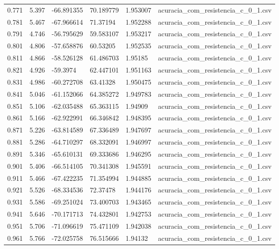 \begin{table}
\begin{tabular}{llllll}
0.771 & 5.397 & -66.891355 & 70.189779 & 1.953007 & acuracia\_com\_resistencia\_c\_0\_1.csv \\
0.781 & 5.467 & -67.966614 & 71.37194 & 1.952288 & acuracia\_com\_resistencia\_c\_0\_1.csv \\
0.791 & 4.746 & -56.795629 & 59.583107 & 1.953217 & acuracia\_com\_resistencia\_c\_0\_1.csv \\
0.801 & 4.806 & -57.658876 & 60.53205 & 1.952535 & acuracia\_com\_resistencia\_c\_0\_1.csv \\
0.811 & 4.866 & -58.526128 & 61.486703 & 1.95185 & acuracia\_com\_resistencia\_c\_0\_1.csv \\
0.821 & 4.926 & -59.3974 & 62.447101 & 1.951163 & acuracia\_com\_resistencia\_c\_0\_1.csv \\
0.831 & 4.986 & -60.272708 & 63.41328 & 1.950475 & acuracia\_com\_resistencia\_c\_0\_1.csv \\
0.841 & 5.046 & -61.152066 & 64.385272 & 1.949783 & acuracia\_com\_resistencia\_c\_0\_1.csv \\
0.851 & 5.106 & -62.035488 & 65.363115 & 1.94909 & acuracia\_com\_resistencia\_c\_0\_1.csv \\
0.861 & 5.166 & -62.922991 & 66.346842 & 1.948395 & acuracia\_com\_resistencia\_c\_0\_1.csv \\
0.871 & 5.226 & -63.814589 & 67.336489 & 1.947697 & acuracia\_com\_resistencia\_c\_0\_1.csv \\
0.881 & 5.286 & -64.710297 & 68.332091 & 1.946997 & acuracia\_com\_resistencia\_c\_0\_1.csv \\
0.891 & 5.346 & -65.610131 & 69.333686 & 1.946295 & acuracia\_com\_resistencia\_c\_0\_1.csv \\
0.901 & 5.406 & -66.514105 & 70.341308 & 1.945591 & acuracia\_com\_resistencia\_c\_0\_1.csv \\
0.911 & 5.466 & -67.422235 & 71.354994 & 1.944885 & acuracia\_com\_resistencia\_c\_0\_1.csv \\
0.921 & 5.526 & -68.334536 & 72.37478 & 1.944176 & acuracia\_com\_resistencia\_c\_0\_1.csv \\
0.931 & 5.586 & -69.251024 & 73.400703 & 1.943465 & acuracia\_com\_resistencia\_c\_0\_1.csv \\
0.941 & 5.646 & -70.171713 & 74.432801 & 1.942753 & acuracia\_com\_resistencia\_c\_0\_1.csv \\
0.951 & 5.706 & -71.096619 & 75.471109 & 1.942038 & acuracia\_com\_resistencia\_c\_0\_1.csv \\
0.961 & 5.766 & -72.025758 & 76.515666 & 1.94132 & acuracia\_com\_resistencia\_c\_0\_1.csv \\

\end{tabular}
\end{table}
